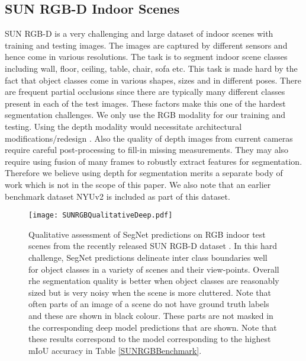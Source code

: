 \documentclass[10pt,journal,compsoc]{IEEEtran}
\begin{document}
\subsection{SUN RGB-D Indoor Scenes}
\label{SUNRGBD}
SUN RGB-D \cite{song2015sun} is a very challenging and large dataset of indoor scenes with  training and  testing images. The images are captured by different sensors and hence come in various resolutions. The task is to segment  indoor scene classes including wall, floor, ceiling, table, chair, sofa etc. This task is made hard by the fact that object classes come in various shapes, sizes and in different poses. There are frequent partial occlusions since there are typically many different classes present in each of the test images. These factors make this one of the hardest segmentation challenges. We only use the RGB modality for our training and testing. Using the depth modality would necessitate architectural modifications/redesign \cite{FCN}. Also the quality of depth images from current cameras require careful post-processing to fill-in missing measurements. They may also require using fusion of many frames to robustly extract features for segmentation. Therefore we believe using depth for segmentation merits a separate body of work which is not in the scope of this paper. We also note that an earlier benchmark dataset NYUv2 \cite{silberman2012indoor} is included as part of this dataset.

\begin{figure*}
\centering
\texttt{[image: SUNRGBQualitativeDeep.pdf]}
\caption{\footnotesize{Qualitative assessment of SegNet predictions on RGB indoor test scenes from the recently released SUN RGB-D dataset \cite{song2015sun}. In this hard challenge, SegNet predictions delineate inter class boundaries well for object classes in a variety of scenes and their view-points. Overall rhe segmentation quality is better when object classes are reasonably sized but is very noisy when the scene is more cluttered. Note that often parts of an image of a scene do not have ground truth labels and these are shown in black colour. These parts are not masked in the corresponding deep model  predictions that are shown. Note that these results correspond to the model corresponding to the highest mIoU accuracy in Table \ref{SUNRGBBenchmark}.}}
\label{SUNRGBDQualy}
\end{figure*}
\end{document}
